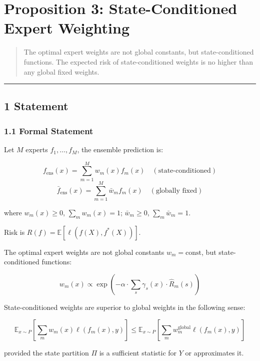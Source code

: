 \documentclass[
  12pt,
]{article}
\author{SCX}
\date{2026}
\begin{document}
\section{Proposition 3: State-Conditioned Expert
Weighting}\label{proposition-3-state-conditioned-expert-weighting}

\begin{quote}
The optimal expert weights are not global constants, but state-conditioned functions. The expected risk of state-conditioned weights is no higher than any global fixed weights.
\end{quote}

\begin{center}\rule{0.5\linewidth}{0.5pt}\end{center}

\subsection{1 Statement}\label{statement}

\subsubsection{1.1 Formal Statement}\label{formal-statement-1}

Let \(M\) experts \(f_1, \ldots, f_M\), the ensemble prediction is:

\[f_{\text{ens}}(x) = \sum_{m=1}^M w_m(x) f_m(x) \quad (\text{state-conditioned})\]
\[\bar{f}_{\text{ens}}(x) = \sum_{m=1}^M \bar{w}_m f_m(x) \quad (\text{globally fixed})\]

where \(w_m(x) \geq 0\), \(\sum_m w_m(x) = 1\); \(\bar{w}_m \geq 0\),
\(\sum_m \bar{w}_m = 1\).

Risk is \(R(f) = \mathbb{E}[\ell(f(X), f^*(X))]\).

The optimal expert weights are not global constants \(w_m = \text{const}\), but state-conditioned functions:

\[w_m(x) \propto \exp\left(-\alpha \cdot \sum_s \gamma_s(x) \cdot \hat{R}_m(s)\right)\]

State-conditioned weights are superior to global weights in the following sense:

\[\mathbb{E}_{x \sim P}\left[\sum_m w_m(x) \ell(f_m(x), y)\right] \leq \mathbb{E}_{x \sim P}\left[\sum_m w_m^{\text{global}} \ell(f_m(x), y)\right]\]

provided the state partition \(\Pi\) is a sufficient statistic for \(Y\) or approximates it.
\end{document}
